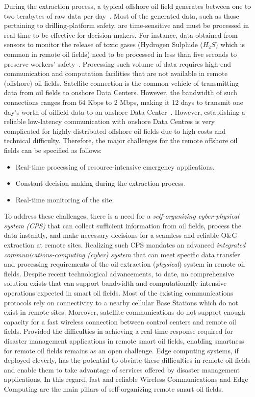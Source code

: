 During the extraction process, a typical offshore oil field generates between one to two terabytes of raw data per day~\cite{sof2}.  Most of the generated data, such as those pertaining to drilling-platform safety, are time-sensitive and must be processed in real-time to be effective for decision makers. For instance, data obtained from sensors to monitor the release of toxic gases (\eg Hydrogen Sulphide ($H_2S$) which is common in remote oil fields) need to be processed in less than five seconds to preserve workers' safety~\cite{PANDEY201287}. Processing such volume of data requires high-end communication and computation facilities that are not available in remote (offshore) oil fields. Satellite connection is the common vehicle of transmitting data from oil fields to onshore Data Centers. However, the bandwidth of such connections ranges from 64 Kbps to 2 Mbps, making it 12 days to transmit one day's worth of oilfield data to an onshore Data Center~\cite{sof2}. However, establishing a reliable low-latency communication with onshore Data Centres is very complicated for highly distributed offshore oil fields due to high costs and technical difficulty\cite{Cisco}. Therefore, the major challenges for the remote offshore oil fields can be specified as follows: 

\begin{itemize}
\item Real-time processing of resource-intensive emergency applications.
\item Constant decision-making during the extraction process.
\item Real-time monitoring of the site.
\end{itemize}

To address these challenges, there is a need for a \emph{self-organizing cyber-physical system (CPS)} that can collect sufficient information from oil fields, process the data instantly, and make necessary decisions for a seamless and reliable O\&G extraction at remote sites. Realizing such CPS mandates an advanced \emph{integrated communications-computing (cyber) system} that can meet specific data transfer and processing requirements of the oil extraction (\emph{physical}) system in remote oil fields. Despite recent technological advancements, to date, no comprehensive solution exists that can support bandwidth and computationally intensive operations expected in smart oil fields. Most of the existing communications protocols rely on connectivity to a nearby cellular Base Stations which do not exist in remote sites. Moreover, satellite communications do not support enough capacity for a fast wireless connection between control centers and remote oil fields. Provided the difficulties in achieving a real-time response required for disaster management applications in remote smart oil fields, enabling smartness for remote oil fields remains as an open challenge. Edge computing systems, if deployed cleverly, has the potential to obviate these difficulties in remote oil fields and enable them to take advantage of services offered by disaster management applications. In this regard, fast and reliable Wireless Communications and Edge Computing are the main pillars of self-organizing remote smart oil fields.

